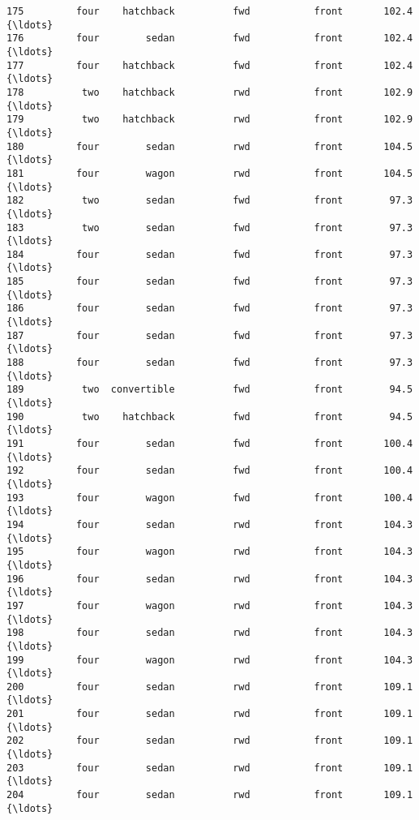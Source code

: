 \documentclass[11pt]{article}
\begin{document}
\begin{tcolorbox}[breakable, boxrule=.5pt, size=fbox, pad at break*=1mm, opacityfill=0]
\begin{Verbatim}[commandchars=\\\{\}]
175         four    hatchback          fwd           front       102.4  {\ldots}
176         four        sedan          fwd           front       102.4  {\ldots}
177         four    hatchback          fwd           front       102.4  {\ldots}
178          two    hatchback          rwd           front       102.9  {\ldots}
179          two    hatchback          rwd           front       102.9  {\ldots}
180         four        sedan          rwd           front       104.5  {\ldots}
181         four        wagon          rwd           front       104.5  {\ldots}
182          two        sedan          fwd           front        97.3  {\ldots}
183          two        sedan          fwd           front        97.3  {\ldots}
184         four        sedan          fwd           front        97.3  {\ldots}
185         four        sedan          fwd           front        97.3  {\ldots}
186         four        sedan          fwd           front        97.3  {\ldots}
187         four        sedan          fwd           front        97.3  {\ldots}
188         four        sedan          fwd           front        97.3  {\ldots}
189          two  convertible          fwd           front        94.5  {\ldots}
190          two    hatchback          fwd           front        94.5  {\ldots}
191         four        sedan          fwd           front       100.4  {\ldots}
192         four        sedan          fwd           front       100.4  {\ldots}
193         four        wagon          fwd           front       100.4  {\ldots}
194         four        sedan          rwd           front       104.3  {\ldots}
195         four        wagon          rwd           front       104.3  {\ldots}
196         four        sedan          rwd           front       104.3  {\ldots}
197         four        wagon          rwd           front       104.3  {\ldots}
198         four        sedan          rwd           front       104.3  {\ldots}
199         four        wagon          rwd           front       104.3  {\ldots}
200         four        sedan          rwd           front       109.1  {\ldots}
201         four        sedan          rwd           front       109.1  {\ldots}
202         four        sedan          rwd           front       109.1  {\ldots}
203         four        sedan          rwd           front       109.1  {\ldots}
204         four        sedan          rwd           front       109.1  {\ldots}


\end{Verbatim}
\end{tcolorbox}
\end{document}
